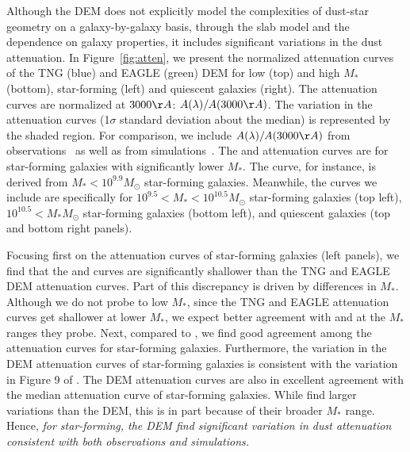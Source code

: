 Although the DEM does not explicitly model the complexities of dust-star geometry on a
galaxy-by-galaxy basis, through the slab model and the dependence on galaxy
properties, it includes significant variations in the dust attenuation. In
Figure~\ref{fig:atten}, we present the normalized attenuation curves of the TNG
(blue) and EAGLE (green) DEM for low (top) and high $M_*$ (bottom),
star-forming (left) and quiescent galaxies (right).  The attenuation curves are
normalized at $3000\AA$: $A(\lambda)/A(3000\AA)$. The variation in the
attenuation curves (1$\sigma$ standard deviation about the median) is
represented by the shaded region. For comparison, we include
$A(\lambda)/A(3000\AA)$ from observations~\citep{calzetti2000, battisti2017, salim2018} 
as well as from simulations~\citep{narayanan2018}. The \cite{calzetti2000} and
\cite{battisti2017} attenuation curves are for star-forming galaxies with
significantly lower $M_*$. The \cite{battisti2017} curve, for instance, is
derived from $M_* < 10^{9.9}M_\odot$ star-forming galaxies. Meanwhile, the
\cite{salim2018} curves we include are specifically for $10^{9.5} < M_* < 10^{10.5}M_\odot$ 
star-forming galaxies (top left), $10^{10.5} < M_*M_\odot$ star-forming
galaxies (bottom left), and quiescent galaxies (top and bottom right panels). 


Focusing first on the attenuation curves of star-forming galaxies (left
panels), we find that the \cite{calzetti2000} and \cite{battisti2017} curves
are significantly shallower than the TNG and EAGLE DEM attenuation curves.
Part of this discrepancy is driven by differences in $M_*$. Although we do not
probe to low $M_*$, since the TNG and EAGLE attenuation curves get shallower at
lower $M_*$, we expect better agreement with \cite{calzetti2000} and
\cite{battisti2017} at the $M_*$ ranges they probe. 
Next, compared to \cite{salim2018}, we find good agreement among the attenuation
curves for star-forming galaxies. Furthermore, the variation in the DEM attenuation curves of star-forming galaxies is consistent with the
variation in Figure 9 of \cite{salim2018}. The DEM attenuation
curves are also in excellent agreement with the median attenuation curve of
\cite{narayanan2018} star-forming galaxies. While \cite{narayanan2018} find
larger variations than the DEM, this is in part because of their broader $M_*$ 
range. Hence, \emph{for star-forming, the DEM find significant variation in dust 
attenuation consistent with both observations and simulations.}

